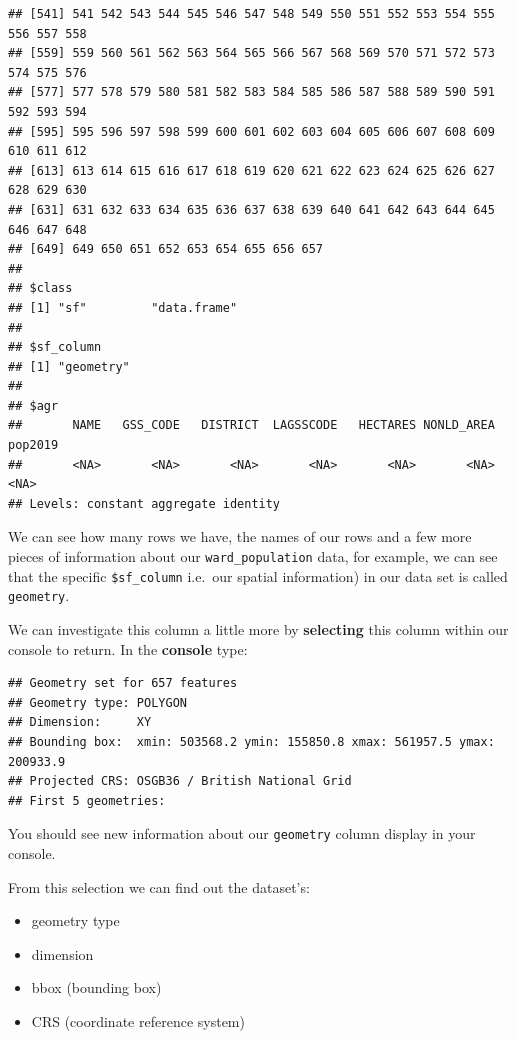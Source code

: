 \documentclass[
]{book}
\newenvironment{Shaded}{\begin{snugshade}}{\end{snugshade}}
\newcommand{\CommentTok}[1]{\textcolor[rgb]{0.56,0.35,0.01}{\textit{#1}}}
\newcommand{\NormalTok}[1]{#1}
\newcommand{\SpecialCharTok}[1]{\textcolor[rgb]{0.00,0.00,0.00}{#1}}
\providecommand{\tightlist}{%
  \setlength{\itemsep}{0pt}\setlength{\parskip}{0pt}}
\begin{document}
\begin{verbatim}
## [541] 541 542 543 544 545 546 547 548 549 550 551 552 553 554 555 556 557 558
## [559] 559 560 561 562 563 564 565 566 567 568 569 570 571 572 573 574 575 576
## [577] 577 578 579 580 581 582 583 584 585 586 587 588 589 590 591 592 593 594
## [595] 595 596 597 598 599 600 601 602 603 604 605 606 607 608 609 610 611 612
## [613] 613 614 615 616 617 618 619 620 621 622 623 624 625 626 627 628 629 630
## [631] 631 632 633 634 635 636 637 638 639 640 641 642 643 644 645 646 647 648
## [649] 649 650 651 652 653 654 655 656 657
## 
## $class
## [1] "sf"         "data.frame"
## 
## $sf_column
## [1] "geometry"
## 
## $agr
##       NAME   GSS_CODE   DISTRICT  LAGSSCODE   HECTARES NONLD_AREA    pop2019 
##       <NA>       <NA>       <NA>       <NA>       <NA>       <NA>       <NA> 
## Levels: constant aggregate identity
\end{verbatim}

We can see how many rows we have, the names of our rows and a few more pieces of information about our \texttt{ward\_population} data, for example, we can see that the specific \texttt{\$sf\_column} i.e.~our spatial information) in our data set is called \texttt{geometry}.

We can investigate this column a little more by \textbf{selecting} this column within our console to return. In the \textbf{console} type:

\begin{Shaded}
\end{Shaded}

\begin{verbatim}
## Geometry set for 657 features 
## Geometry type: POLYGON
## Dimension:     XY
## Bounding box:  xmin: 503568.2 ymin: 155850.8 xmax: 561957.5 ymax: 200933.9
## Projected CRS: OSGB36 / British National Grid
## First 5 geometries:
\end{verbatim}

You should see new information about our \texttt{geometry} column display in your console.

From this selection we can find out the dataset's:

\begin{itemize}
\tightlist
\item
  geometry type
\item
  dimension
\item
  bbox (bounding box)
\item
  CRS (coordinate reference system)
\end{itemize}
\end{document}
